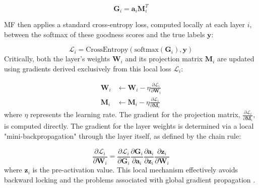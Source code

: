 \begin{equation}
\mathbf{G}_i = \mathbf{a}_i \mathbf{M}_i^T
\tag{2.7} \label{eq:mf_goodness_chap2}
\end{equation}

MF then applies a standard cross-entropy loss, computed locally at each layer $i$, between the softmax of these goodness scores and the true labels $\mathbf{y}$:

\begin{equation}
\mathcal{L}_i = \text{CrossEntropy}(\text{softmax}(\mathbf{G}_i), \mathbf{y})
\tag{2.8} \label{eq:mf_loss_chap2}
\end{equation}
Critically, both the layer's weights $\mathbf{W}_i$ and its projection matrix $\mathbf{M}_i$ are updated using gradients derived exclusively from this local loss $\mathcal{L}_i$:

\begin{align}
\mathbf{W}_i &\leftarrow \mathbf{W}_i - \eta \frac{\partial \mathcal{L}_i}{\partial \mathbf{W}_i} \tag{2.9} \label{eq:mf_update_W_chap2} \\
\mathbf{M}_i &\leftarrow \mathbf{M}_i - \eta \frac{\partial \mathcal{L}_i}{\partial \mathbf{M}_i} \tag{2.10} \label{eq:mf_update_M_chap2}
\end{align}
where $\eta$ represents the learning rate. The gradient for the projection matrix, $\frac{\partial \mathcal{L}_i}{\partial \mathbf{M}_i}$, is computed directly. The gradient for the layer weights is determined via a local "mini-backpropagation" through the layer itself, as defined by the chain rule:

\begin{equation}
\frac{\partial \mathcal{L}_i}{\partial \mathbf{W}_i} = \frac{\partial \mathcal{L}_i}{\partial \mathbf{G}_i} \frac{\partial \mathbf{G}_i}{\partial \mathbf{a}_i} \frac{\partial \mathbf{a}_i}{\partial \mathbf{z}_i} \frac{\partial \mathbf{z}_i}{\partial \mathbf{W}_i}
\tag{2.11} \label{eq:mf_local_chain_rule}
\end{equation}
where $\mathbf{z}_i$ is the pre-activation value. This local mechanism effectively avoids backward locking and the problems associated with global gradient propagation \cite{gong2025mono}.

